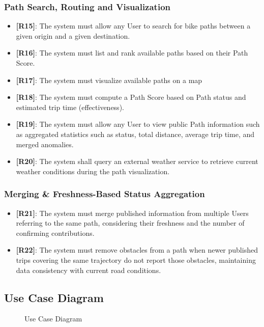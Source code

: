 \subsubsection{Path Search, Routing and Visualization}

\begin{itemize}
    \item \textbf{[R15]}: The system must allow any User to search for bike paths between a given origin and a given destination.
    \item \textbf{[R16]}: The system must list and rank available paths based on their Path Score.
    \item \textbf{[R17]}: The system must visualize available paths on a map
    \item \textbf{[R18]}: The system must compute a Path Score based on Path status and estimated trip time (effectiveness).
    \item \textbf{[R19]}: The system must allow any User to view public Path information such as aggregated statistics such as status, total distance, average trip time, and merged anomalies.
    \item \textbf{[R20]}: The system shall query an external weather service to retrieve current weather conditions during the path visualization.
\end{itemize}

\subsubsection{Merging \& Freshness-Based Status Aggregation}

\begin{itemize}
    \item \textbf{[R21]}: The system must merge published information from multiple Users referring to the same path, considering their freshness and the number of confirming contributions.
    \item \textbf{[R22]}: The system must remove obstacles from a path when newer published trips covering the same trajectory do not report those obstacles, maintaining data consistency with current road conditions.
\end{itemize}

\label{sec:use_cases}
\subsection{Use Case Diagram}

\begin{figure}[H]
    \centering
    
    \caption{Use Case Diagram}
    \label{fig:use_case_diagram}
\end{figure}

